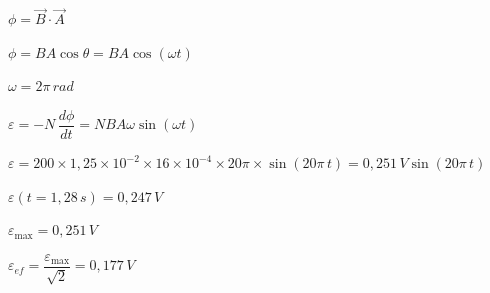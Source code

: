 \begin{solapartat}
 $\phi = \vec{B}\cdot\vec{A}$

\smallskip
{} $\phi = BA\cos\theta = BA\cos(\omega t)$

\smallskip
 $\omega = 2\pi\,rad$

\smallskip
{} $\varepsilon = -N\,\dfrac{d\phi}{dt} = NBA\omega\sin(\omega t)$

\smallskip
{} $\varepsilon = 200\times 1,25\times 10^{-2}\times 16\times 10^{-4}\times 20\pi\times\sin(20\pi\,t) = 0,251\,V\sin(20\pi\,t)$

\smallskip
 $\varepsilon(t = 1,28\,s) = 0,247\,V$
\end{solapartat}

\begin{solapartat}
 $\varepsilon_{\max} = 0,251\,V$

\smallskip
{} $\varepsilon_{ef} = \dfrac{\varepsilon_{\max}}{\sqrt{2}} = 0,177\,V$

\medskip
\noindent\begin{minipage}{\linewidth}
\end{minipage}
\end{solapartat}
